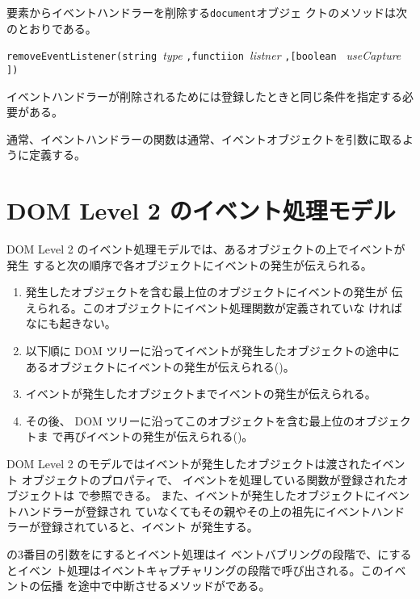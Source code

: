要素からイベントハンドラーを削除する\texttt{document}オブジェ
クトのメソッドは次のとおりである。

\texttt{removeEventListener(string }{\sl type}
\texttt{,functiion }{\sl listner}
\texttt{,[boolean }
{\sl useCapture}
\texttt{])}

\noindent
イベントハンドラーが削除されるためには登録したときと同じ条件を指定する必
要がある。

通常、イベントハンドラーの関数は通常、イベントオブジェクトを引数に取るよ
うに定義する。
\iffalse
このオブジェクトは表%
\ref{mouseeventmethod}のようなプロパティ%
を持つ。
\fi
\section{DOM Level 2 のイベント処理モデル}
DOM Level 2 のイベント処理モデルでは、あるオブジェクトの上でイベントが発生
すると次の順序で各オブジェクトにイベントの発生が伝えられる。
\begin{enumerate}
 \item 発生したオブジェクトを含む最上位のオブジェクトにイベントの発生が
       伝えられる。このオブジェクトにイベント処理関数が定義されていな
       ければなにも起きない。
 \item 以下順に DOM ツリーに沿ってイベントが発生したオブジェクトの途中に
       あるオブジェクトにイベントの発生が伝えられる()。
 \item イベントが発生したオブジェクトまでイベントの発生が伝えられる。
 \item その後、
       DOM ツリーに沿ってこのオブジェクトを含む最上位のオブジェクトま
       で再びイベントの発生が伝えられる()。
\end{enumerate}
DOM Level 2 のモデルではイベントが発生したオブジェクトは渡されたイベント
オブジェクトのプロパティで、
イベントを処理している関数が登録されたオブジェクトは
で参照できる。
%
また、イベントが発生したオブジェクトにイベントハンドラーが登録され
ていなくてもその親やその上の祖先にイベントハンドラーが登録されていると、イベント
が発生する。


の3番目の引数をにするとイベント処理はイ
ベントバブリングの段階で、にするとイベン
ト処理はイベントキャプチャリングの段階で呼び出される。このイベントの伝播
を途中で中断させるメソッドがである。

